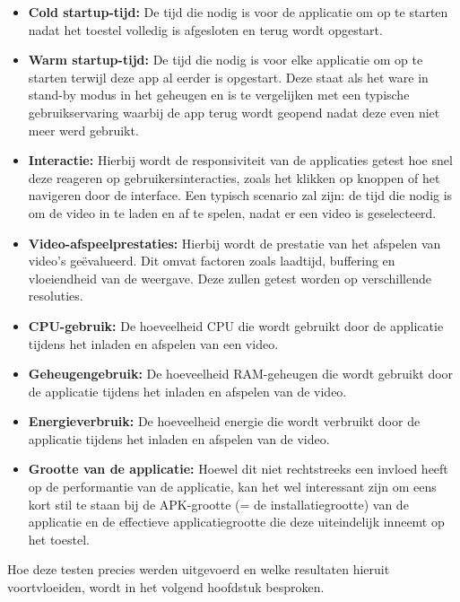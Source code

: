 \begin{itemize}
    \item \textbf{Cold startup-tijd:} De tijd die nodig is voor de applicatie om op te starten nadat het toestel volledig is afgesloten en terug wordt opgestart.
    \item \textbf{Warm startup-tijd:} De tijd die nodig is voor elke applicatie om op te starten terwijl deze app al eerder is opgestart. Deze staat als het ware in stand-by modus in het geheugen en is te vergelijken met een typische gebruikservaring waarbij de app terug wordt geopend nadat deze even niet meer werd gebruikt.
    \item \textbf{Interactie:} Hierbij wordt de responsiviteit van de applicaties getest hoe snel deze reageren op gebruikersinteracties, zoals het klikken op knoppen of het navigeren door de interface. Een typisch scenario zal zijn: de tijd die nodig is om de video in te laden en af te spelen, nadat er een video is geselecteerd.
    \item \textbf{Video-afspeelprestaties:} Hierbij wordt de prestatie van het afspelen van video's geëvalueerd. Dit omvat factoren zoals laadtijd, buffering en vloeiendheid van de weergave. Deze zullen getest worden op verschillende resoluties.
    \item \textbf{CPU-gebruik:} De hoeveelheid CPU die wordt gebruikt door de applicatie tijdens het inladen en afspelen van een video.
    \item \textbf{Geheugengebruik:} De hoeveelheid RAM-geheugen die wordt gebruikt door de applicatie tijdens het inladen en afspelen van de video.
    \item \textbf{Energieverbruik:} De hoeveelheid energie die wordt verbruikt door de applicatie tijdens het inladen en afspelen van de video.
    \item \textbf{Grootte van de applicatie:} Hoewel dit niet rechtstreeks een invloed heeft op de performantie van de applicatie, kan het wel interessant zijn om eens kort stil te staan bij de APK-grootte (= de installatiegrootte) van de applicatie en de effectieve applicatiegrootte die deze uiteindelijk inneemt op het toestel.
\end{itemize}

Hoe deze testen precies werden uitgevoerd en welke resultaten hieruit voortvloeiden, wordt in het volgend hoofdstuk besproken.
